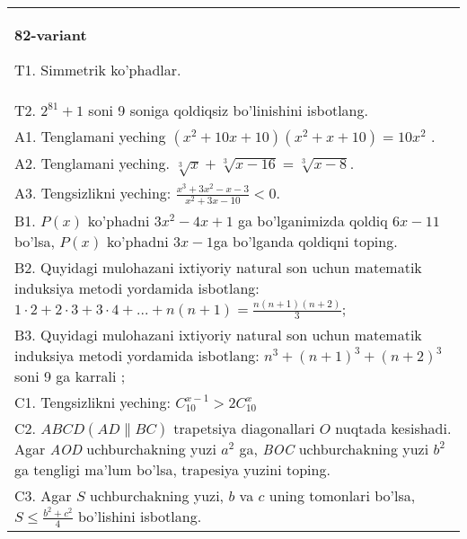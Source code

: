 \documentclass{article}
\begin{document}
\begin{tabular}{m{17cm}}
\textbf{82-variant}
\newline

T1. Simmetrik ko'phadlar. \\
T2. \(2^{81} + 1\) soni 9 soniga qoldiqsiz bo'linishini isbotlang. \\
A1. Tenglamani yeching \(\left( x^{2} + 10x + 10 \right)\left( x^{2} + x + 10 \right) = 10x^{2}\) . \\
A2. Tenglamani yeching. \(\sqrt[3]{x} + \sqrt[3]{x - 16} = \sqrt[3]{x - 8}\). \\
A3. Tengsizlikni yeching: \(\frac{x^{3} + 3x^{2} - x - 3}{x^{2} + 3x - 10} < 0\). \\
B1. \(P(x)\) ko'phadni \(3x^{2} - 4x + 1\) ga bo'lganimizda qoldiq \(6x - 11\) bo'lsa, \(P(x)\) ko'phadni \(3x - 1\)ga bo'lganda qoldiqni toping. \\
B2. Quyidagi mulohazani ixtiyoriy natural son uchun matematik induksiya metodi yordamida isbotlang: \(1 \cdot 2 + 2 \cdot 3 + 3 \cdot 4 + ... + n(n + 1) = \frac{n(n + 1)(n + 2)}{3}\); \\
B3. Quyidagi mulohazani ixtiyoriy natural son uchun matematik induksiya metodi yordamida isbotlang: \(n^{3} + (n + 1)^{3} + (n + 2)^{3}\) soni 9 ga karrali ; \\
C1. Tengsizlikni yeching: \(C_{10}^{x - 1} > 2C_{10}^{x}\) \\
C2. \(ABCD(AD\| BC)\) trapetsiya diagonallari \(O\) nuqtada kesishadi. Agar \emph{AOD} uchburchakning yuzi \(a^{2}\) ga, \emph{BOC} uchburchakning yuzi \(b^{2}\) ga tengligi ma'lum bo'lsa, trapesiya yuzini toping. \\
C3. Agar \(S\) uchburchakning yuzi, \(b\) va \(c\) uning tomonlari bo'lsa, \(S \leq \frac{b^{2} + c^{2}}{4}\) bo'lishini isbotlang. \\

\end{tabular}
\vspace{1cm}
\end{document}
